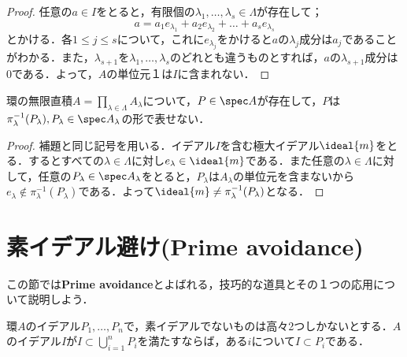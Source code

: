 \begin{proof}
	任意の$a\in I$をとると，有限個の$\lambda_1,\dots,\lambda_s\in \Lambda$が存在して；
	\[a=a_1e_{\lambda_1}+a_2e_{\lambda_2}+\dots+a_se_{\lambda_s}\]
	とかける．各$1\leq j\leq s$について，これに$e_{\lambda_j}$をかけると$a$の$\lambda_j$成分は$a_j$であることがわかる．また，$\lambda_{s+1}$を$\lambda_1,\dots,\lambda_s$のどれとも違うものとすれば，$a$の$\lambda_{s+1}$成分は0である．よって，$A$の単位元$１$は$I$に含まれない．
\end{proof}

\begin{prop}
	環の無限直積$A=\prod_{\lambda\in \Lambda}A_\lambda$について，$P\in\spec A$が存在して，$P$は$\pi^{-1}_\lambda(P_\lambda),P_\lambda\in\spec A_\lambda$の形で表せない．
\end{prop}

\begin{proof}
	補題と同じ記号を用いる．イデアル$I$を含む極大イデアル${\ideal{m}}$をとる．するとすべての$\lambda\in \Lambda$に対し$e_\lambda\in{\ideal{m}}$である．また任意の$\lambda\in \Lambda$に対して，任意の$P_\lambda\in\spec A_\lambda$をとると，$P_\lambda$は$A_\lambda$の単位元を含まないから$e_\lambda\not\in\pi^{-1}_\lambda(P_\lambda)$である．よって${\ideal{m}}\neq\pi_\lambda^{-1}(P_\lambda)$となる．
\end{proof}

\section{素イデアル避け(Prime avoidance)}
この節では\textbf{Prime avoidance}とよばれる，技巧的な道具とその１つの応用について説明しよう．
\begin{lem}\label{lem:Prime avoidance}
	環$A$のイデアル$P_1,\dots, P_n$で，素イデアルでないものは高々2つしかないとする．$A$のイデアル$I$が$I\subset\bigcup_{i=1}^n P_i$を満たすならば，ある$i$について$I\subset P_i$である．
\end{lem}

